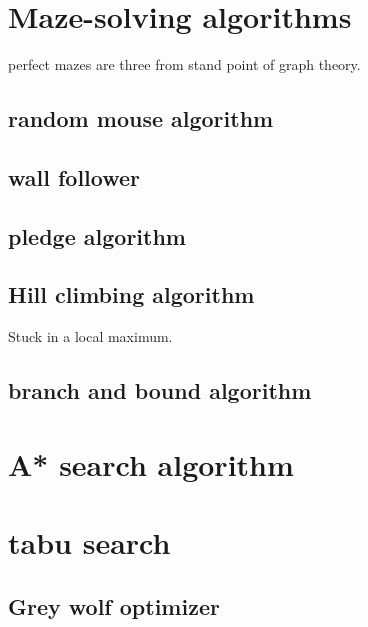 \documentclass[10pt,a4paper]{article}
\begin{document}
\section{Maze-solving algorithms}
perfect mazes are three from stand point of graph theory.

\subsection{random mouse algorithm}



\subsection{wall follower}


\subsection{pledge algorithm}



\subsection{Hill climbing algorithm}

Stuck in a local maximum.



\subsection{branch and bound algorithm}




\section{A* search algorithm}



\section{tabu search}


\subsection{Grey wolf optimizer}
\end{document}
